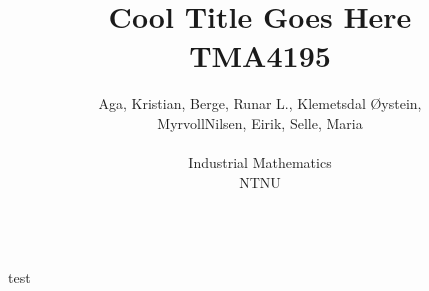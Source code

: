 \documentclass[12pt]{article}
\author{Aga, Kristian, Berge, Runar L., Klemetsdal Øystein,\\
	MyrvollNilsen, Eirik, Selle, Maria\\\\
	Industrial Mathematics\\
	NTNU \\\\
}
\title{Cool Title Goes Here \\                                                               
	TMA4195}
\begin{document}
	\maketitle
test
\end{document}
